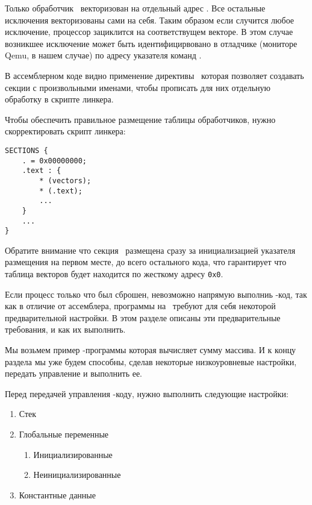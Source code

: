 Только обработчик \ векторизован на отдельный адрес . Все
остальные исключения векторизованы сами на себя. Таким образом если случится любое
исключение, процессор зациклится на соответствущем векторе. В этом случае
возникшее исключение может быть идентифицирвовано в отладчике (мониторе Qemu,
в нашем случае) по адресу указателя команд .

В ассемблерном коде видно применение директивы \ которая позволяет
создавать секции с произвольными именами, чтобы прописать для них отдельную
обработку в скрипте линкера.

Чтобы обеспечить правильное размещение таблицы обработчиков, нужно
скорректировать скрипт линкера: 

\begin{verbatim}
SECTIONS {
	. = 0x00000000;
	.text : {
		* (vectors);
		* (.text); 
		...
	}
	...
}
\end{verbatim}

Обратите внимание что секция \ размещена сразу за инициализацией
указателя размещения на первом месте, до всего остального кода, что гарантирует
что таблица векторов будет находится по жесткому адресу \verb|0x0|.


\secdown

Если процесс только что был сброшен, невозможно напрямую выполниь \ci-код,
так как в отличие от ассемблера, программы на \ci\ требуют для себя некоторой
предварительной настройки. В этом разделе описаны эти предварительные требования,
и как их выполнить.

Мы возьмем пример \ci-программы которая вычисляет сумму массива. И к концу
раздела мы уже будем способны, сделав некоторые низкоуровневые
настройки, передать управление и выполнить ее.


Перед передачей управления \ci-коду, нужно выполнить следующие настройки:

\begin{enumerate}[nosep]
\item
  Стек
\item
  Глобальные переменные
  \begin{enumerate}[nosep]
    \item 
    Инициализированные
    \item 
    Неинициализированные
  \end{enumerate}
\item
  Константные данные
\end{enumerate}

